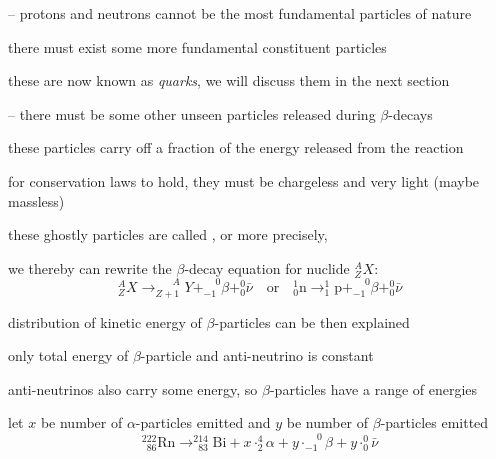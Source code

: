 \begin{compactenum}
	\item[--] protons and neutrons cannot be the most fundamental particles of nature
	
	there must exist some more fundamental constituent particles
	
	these are now known as \emph{quarks}, we will discuss them in the next section
	
	\item[--] there must be some other unseen particles released during $\beta$-decays
	
	these particles carry off a fraction of the energy released from the reaction
	
	for conservation laws to hold, they must be chargeless and very light (maybe massless)
	
	these ghostly particles are called , or more precisely, 
\end{compactenum}

\cmt we thereby can rewrite the $\beta$-decay equation for nuclide $_Z^A X$:
\begin{equation*}
\boxed{_Z^A X \longrightarrow _{Z+1}^{\phantom{1+}A} Y + _{-1}^{\phantom{+}0}\beta + _0^0 \bar{\nu}} \quad \text{or} \quad \boxed{_0^1 \text{n} \longrightarrow _1^1 \text{p} + _{-1}^{\phantom{+}0}\beta + _0^0 \bar{\nu}} \label{eqn:beta-decay}
\end{equation*}

\cmt distribution of kinetic energy of $\beta$-particles can be then explained

only total energy of $\beta$-particle and anti-neutrino is constant

anti-neutrinos also carry some energy, so $\beta$-particles have a range of energies


\sol let $x$ be number of $\alpha$-particles emitted and $y$ be number of $\beta$-particles emitted
\begin{equation*}
	^{222}_{\phantom{2}86}\text{Rn} \longrightarrow ^{214}_{\phantom{2}83}\text{Bi} + x \cdot ^4_2 \alpha + y \cdot _{-1}^{\phantom{+}0}\beta + y \cdot _0^0 \bar{\nu}
\end{equation*}

